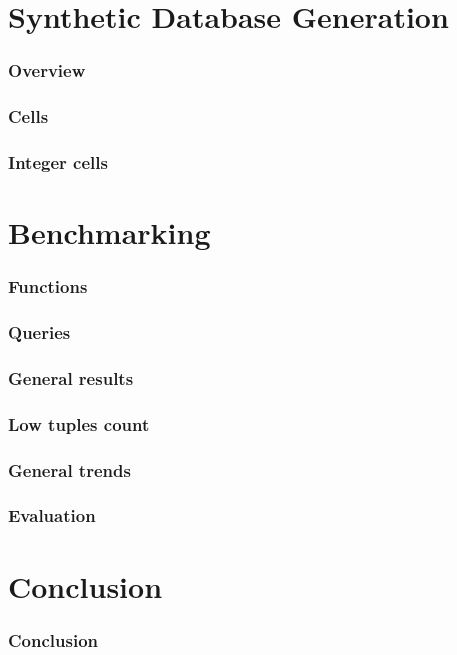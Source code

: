 \documentclass{beamer}
\begin{document}
\section{Synthetic Database Generation}
\begin{frame}
\frametitle{Overview}
\end{frame}

\begin{frame}
\frametitle{Cells}
\end{frame}

\begin{frame}
\frametitle{Integer cells}
\end{frame}

\section{Benchmarking}
\begin{frame}
\frametitle{Functions}
\end{frame}
\begin{frame}
\frametitle{Queries}
\end{frame}

\begin{frame}
\frametitle{General results}
\end{frame}

\begin{frame}
\frametitle{Low tuples count}
\end{frame}

\begin{frame}
\frametitle{General trends}
\end{frame}

\begin{frame}
\frametitle{Evaluation}
\end{frame}

\section{Conclusion}
\begin{frame}
\frametitle{Conclusion}
\end{frame}
\end{document}
